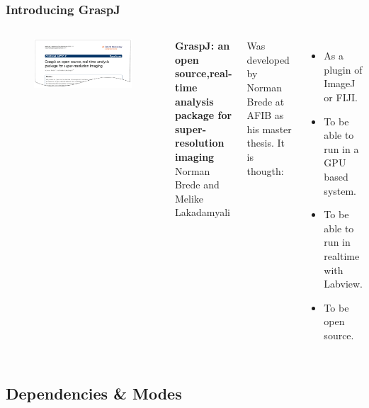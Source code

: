 \documentclass[aspectratio=169]{beamer}
\begin{document}
\begin{frame}
\frametitle{Introducing GraspJ}

\begin{columns}[c]


 

\begin{figure}[h!]
    \centering	\includegraphics[width=\textwidth]{./images/graspj_paper.pdf} 
    \end{figure} 

\textbf{GraspJ: an open source,real-time analysis package for super-resolution imaging}  \\  
Norman Brede and Melike Lakadamyali    


Was developed by Norman Brede at AFIB as his master thesis. It is thougth:

\begin{itemize}
 \item As a plugin of ImageJ or FIJI.
 \item To be able to run in a GPU based system.
 \item To be able to run in realtime with Labview.  
 \item To be open source.
\end{itemize}



\end{columns}
    
    
\end{frame}


\subsection{Dependencies \& Modes}
\end{document}
